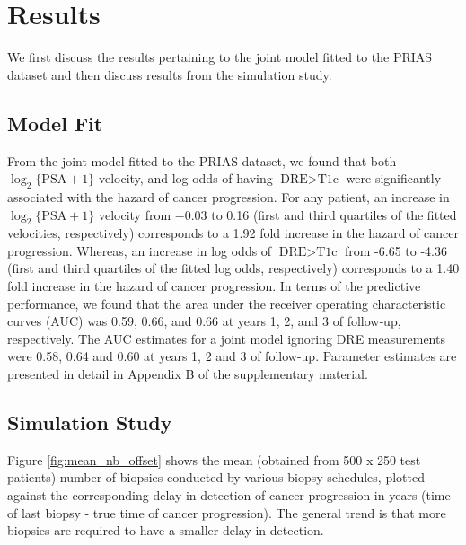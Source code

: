 
\section{Results}
\label{sec:results}
We first discuss the results pertaining to the joint model fitted to the PRIAS dataset and then discuss results from the simulation study.
\subsection{Model Fit}
From the joint model fitted to the PRIAS dataset, we found that both $\log_2 \{\mbox{PSA} + 1\}$ velocity,  and log odds of having $\mbox{DRE} > \mbox{T1c}$  were significantly associated with the hazard of cancer progression. For any patient, an increase in $\log_2 \{\mbox{PSA} + 1\}$ velocity from −0.03 to 0.16 (first and third quartiles of the fitted velocities, respectively) corresponds to a 1.92 fold increase in the hazard of cancer progression. Whereas, an increase in log odds of $\mbox{DRE} > \mbox{T1c}$ from -6.65 to -4.36 (first and third quartiles of the fitted log odds, respectively) corresponds to a 1.40 fold increase in the hazard of cancer progression. In terms of the predictive performance, we found that the area under the receiver operating characteristic curves (AUC) \cite{landmarking2017} was 0.59, 0.66, and 0.66 at years 1, 2, and 3 of follow‐up, respectively. The AUC estimates for a joint model ignoring DRE measurements were 0.58, 0.64 and 0.60 at years 1, 2 and 3 of follow-up. Parameter estimates are presented in detail in Appendix B of the supplementary material.

\subsection{Simulation Study}
Figure \ref{fig:mean_nb_offset} shows the mean (obtained from 500 x 250 test patients) number of biopsies conducted by various biopsy schedules, plotted against the corresponding delay in detection of cancer progression in years (time of last biopsy - true time of cancer progression). The general trend is that more biopsies are required to have a smaller delay in detection.

